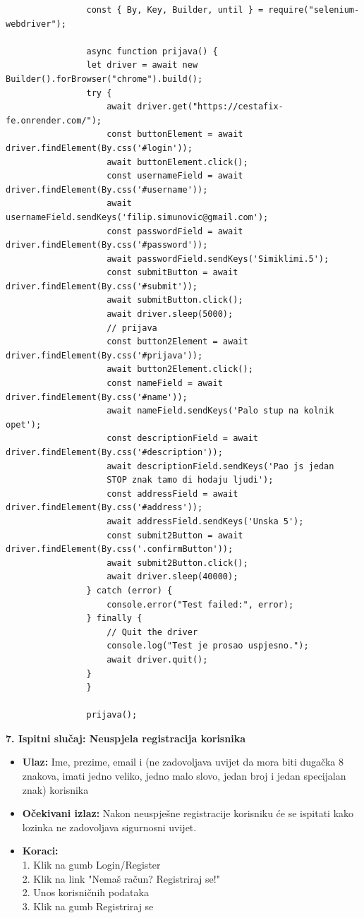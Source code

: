 			\begin{verbatim}
				const { By, Key, Builder, until } = require("selenium-webdriver");

				async function prijava() {
				let driver = await new Builder().forBrowser("chrome").build();
				try {
					await driver.get("https://cestafix-fe.onrender.com/");
					const buttonElement = await driver.findElement(By.css('#login'));
					await buttonElement.click();
					const usernameField = await driver.findElement(By.css('#username'));
					await usernameField.sendKeys('filip.simunovic@gmail.com');
					const passwordField = await driver.findElement(By.css('#password'));
					await passwordField.sendKeys('Simiklimi.5');
					const submitButton = await driver.findElement(By.css('#submit'));
					await submitButton.click();
					await driver.sleep(5000);
					// prijava
					const button2Element = await driver.findElement(By.css('#prijava'));
					await button2Element.click();
					const nameField = await driver.findElement(By.css('#name'));
					await nameField.sendKeys('Palo stup na kolnik opet');
					const descriptionField = await driver.findElement(By.css('#description'));
					await descriptionField.sendKeys('Pao js jedan 
					STOP znak tamo di hodaju ljudi');
					const addressField = await driver.findElement(By.css('#address'));
					await addressField.sendKeys('Unska 5');
					const submit2Button = await driver.findElement(By.css('.confirmButton'));
					await submit2Button.click();
					await driver.sleep(40000);
				} catch (error) {
					console.error("Test failed:", error);
				} finally {
					// Quit the driver
					console.log("Test je prosao uspjesno.");
					await driver.quit();
				}
				}

				prijava();
			\end{verbatim}


			
			\textbf{7. Ispitni slučaj: Neuspjela registracija korisnika}
			 \begin{itemize}
				\item \textbf{Ulaz:} Ime, prezime, email i  (ne zadovoljava uvijet da mora biti dugačka 8 znakova, imati jedno veliko, jedno malo slovo, jedan broj i jedan specijalan znak) korisnika
				\item \textbf{Očekivani izlaz:} Nakon neuspješne registracije korisniku će se ispitati kako lozinka ne zadovoljava sigurnosni uvijet.
				\item \textbf{Koraci:} 
				\\ 1. Klik na gumb Login/Register
				\\ 2. Klik na link "Nemaš račun? Registriraj se!"
				\\ 2. Unos korisničnih podataka
				\\ 3. Klik na gumb Registriraj se
			\end{itemize}

